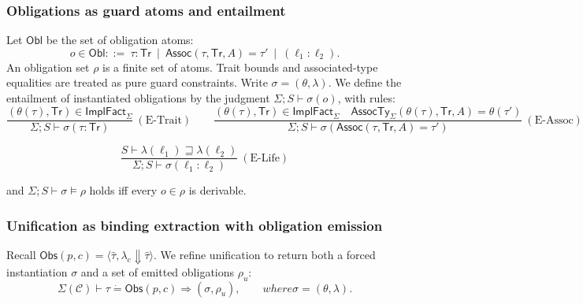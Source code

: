\documentclass[runningheads]{llncs}
\newcommand{\TokObs}{\mathsf{Obs}}
\newcommand{\unify}{\mathrel{\dot{=}}}
\newcommand{\LamCut}[2]{#1\Downarrow #2}
\begin{document}
\subsubsection{Obligations as guard atoms and entailment}
Let $\mathsf{Obl}$ be the set of obligation atoms:
\begin{equation*}
    o \in \mathsf{Obl} ::=~ \tau:\mathsf{Tr}
    \ \mid\ 
    \mathsf{Assoc}(\tau,\mathsf{Tr},A)=\tau'
    \ \mid\
    (\ell_1:\ell_2).
\end{equation*}
An obligation set $\rho$ is a finite set of atoms. Trait bounds and associated-type equalities are treated as pure guard constraints.
Write $\sigma=(\theta,\lambda)$.  We define the entailment of instantiated obligations by the judgment
$\Sigma;S \vdash \sigma(o)$, with rules:
\[
\frac{
(\theta(\tau),\mathsf{Tr})\in \mathsf{ImplFact}_{\Sigma}
}{
\Sigma;S \vdash \sigma(\tau:\mathsf{Tr})
}
\ (\text{E-Trait})
\qquad
\frac{
(\theta(\tau),\mathsf{Tr})\in \mathsf{ImplFact}_{\Sigma}
\quad
\mathsf{AssocTy}_{\Sigma}(\theta(\tau),\mathsf{Tr},A)=\theta(\tau')
}{
\Sigma;S \vdash \sigma(\mathsf{Assoc}(\tau,\mathsf{Tr},A)=\tau')
}
\ (\text{E-Assoc})
\]

\[
\frac{
S \vdash \lambda(\ell_1)\sqsupseteq \lambda(\ell_2)
}{
\Sigma;S \vdash \sigma(\ell_1:\ell_2)
}
\ (\text{E-Life})
\]

and $\Sigma;S \vdash \sigma \models \rho$ holds iff every $o\in\rho$ is derivable.

\subsubsection{Unification as binding extraction with obligation emission}
Recall $\TokObs(p,c)=\langle \hat\tau,\LamCut{\lambda_c}{\hat\tau}\rangle$.
We refine unification to return both a forced instantiation $\sigma$ and a set of emitted obligations $\rho_u$:
\begin{equation*}
   \Sigma(\mathcal{C}) \vdash \tau \unify \TokObs(p,c) \Rightarrow (\sigma,\rho_u),
    \qquad where \sigma=(\theta,\lambda). 
\end{equation*}
\end{document}
